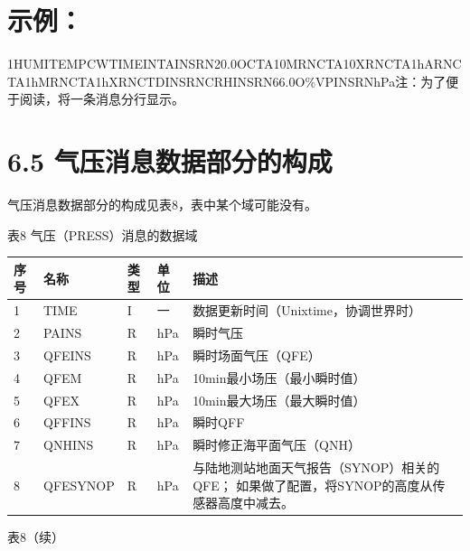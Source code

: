 \documentclass[
  10
]{article}
\begin{document}
\section{示例：}\label{ux793aux4f8b-1}

1\textbar HUMITEMP\textbar CWTIME\textbar I\textbar N\textbar TAINS\textbar R\textbar N\textbar20.0O\textbar CTA10M\textbar R\textbar N\textbar CTA10X\textbar R\textbar N\textbar CTA1hA\textbar R\textbar N\textbar CTA1hM\textbar R\textbar N\textbar CTA1hX\textbar R\textbar N\textbar CTDINS\textbar R\textbar N\textbar CRHINS\textbar R\textbar N\textbar66.0O\textbar\%VPINS\textbar R\textbar N\textbar hPa注：为了便于阅读，将一条消息分行显示。

\section{6.5
气压消息数据部分的构成}\label{ux6c14ux538bux6d88ux606fux6570ux636eux90e8ux5206ux7684ux6784ux6210}

气压消息数据部分的构成见表8，表中某个域可能没有。

表8 气压（PRESS）消息的数据域

\begin{longtable}[]{@{}|l|l|l|l|l|@{}}
\toprule\noalign{}
\endhead
\bottomrule\noalign{}
\endlastfoot
\hline
序号 & 名称 & 类型 & 单位 & 描述 \\
\hline
1 & TIME & I & 一 & 数据更新时间（Unixtime，协调世界时） \\
\hline
2 & PAINS & R & hPa & 瞬时气压 \\
\hline
3 & QFEINS & R & hPa & 瞬时场面气压（QFE） \\
\hline
4 & QFEM & R & hPa & 10min最小场压（最小瞬时值） \\
\hline
5 & QFEX & R & hPa & 10min最大场压（最大瞬时值） \\
\hline
6 & QFFINS & R & hPa & 瞬时QFF \\
\hline
7 & QNHINS & R & hPa & 瞬时修正海平面气压（QNH） \\
\hline
8 & QFESYNOP & R & hPa & 与陆地测站地面天气报告（SYNOP）相关的QFE；
如果做了配置，将SYNOP的高度从传感器高度中减去。 \\
\hline
\end{longtable}

表8（续）
\end{document}
